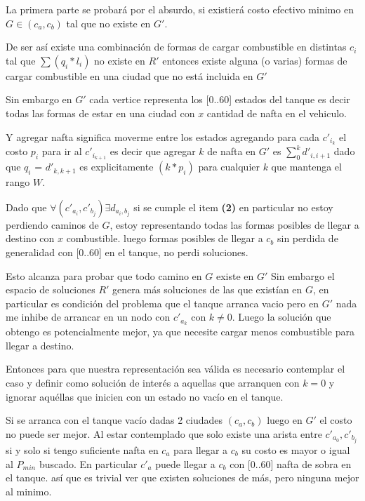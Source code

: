 \documentclass[12pt]{article}
\begin{document}
La primera parte se probará por el absurdo, si existierá costo efectivo minimo en $G \in (c_a,c_b)$ tal que no existe en $G'$.

De ser así existe una combinación de formas de cargar combustible en distintas $c_i$ tal que $\sum (q_i * l_i)$ no existe en $R'$ entonces existe alguna (o varias) formas de cargar combustible en una ciudad que no está incluida en $G'$

Sin embargo en $G'$ cada vertice representa los [0..60] estados del tanque es decir todas las formas de estar en una ciudad con $x$ cantidad de nafta en el vehiculo.

Y agregar nafta significa moverme entre los estados agregando para cada $c'_{i_k}$ el costo $p_i$ para ir al $c'_{i_{k+1}}$ es decir que agregar $k$ de nafta en $G'$ es $\sum_0^k d'_{i,i+1}$ dado que $q_i$ = $d'_{k,k+1}$ es explicitamente $(k * p_i)$ para cualquier $k$ que mantenga el rango $W$.

Dado que $\forall (c'_{a_i}, c'_{b_j}) \exists d_{a_i,b_j}$ si se cumple el item \textbf{(2)} en particular no estoy perdiendo caminos de $G$, estoy representando todas las formas posibles de llegar a destino con $x$ combustible. luego formas posibles de llegar a $c_{b}$ sin perdida de generalidad con [0..60] en el tanque, no perdi soluciones.

Esto alcanza para probar que todo camino en $G$ existe en $G'$ Sin embargo el espacio de soluciones $R'$ genera más soluciones de las que existían en $G$, en particular es condición del problema que el tanque arranca vacio pero en $G'$ nada me inhibe de arrancar en un nodo con $c'_{a_k}$ con $k \neq 0$. Luego la solución que obtengo es potencialmente mejor, ya que necesite cargar menos combustible para llegar a destino.

Entonces para que nuestra representación sea válida es necesario contemplar el caso y definir como solución de interés a aquellas que arranquen con $k = 0$ y ignorar aquéllas que inicien con un estado no vacío en el tanque.

Si se arranca con el tanque vacío dadas 2 ciudades $(c_a, c_b)$ luego en $G'$ el costo no puede ser mejor. Al estar contemplado que solo existe una arista entre $c'_{a_0}, c'_{b_j}$ si y solo si tengo suficiente nafta en $c_a$ para llegar a $c_b$ su costo es mayor o igual al $P_{min}$ buscado. En particular $c'_a$ puede llegar a $c_b$ con [0..60] nafta de sobra en el tanque. así que es trivial ver que existen soluciones de más, pero ninguna mejor al minimo. 
\end{document}
